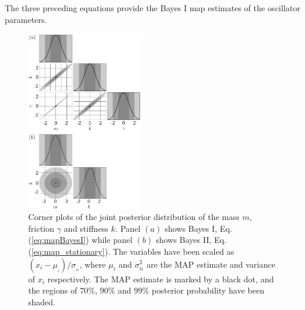 \documentclass[english,aps, twocolumn, pre,superscriptaddress, notitlepage]{revtex4-1}
\begin{document}
The three preceding equations provide the Bayes I map estimates of
the oscillator parameters. 
\begin{figure}
\includegraphics[width=0.45\textwidth]{Fig2}\caption{Corner plots of the joint posterior distribution of the mass $m$,
friction $\gamma$ and stiffness $k$. Panel $(a)$ shows Bayes I,
Eq.(\ref{eq:mapBayesI}) while panel $(b)$ shows Bayes II, Eq.(\ref{eq:map_stationary}).
The variables have been scaled as $\left(x_{i}-\mu_{_{i}}\right)/\sigma_{_{ii}}$,
where $\mu_{i}$ and $\sigma_{ii}^{2}$ are the MAP estimate and variance
of $x_{i}$ respectively. The MAP estimate is marked by a black dot,
and the regions of $70\%$, $90\%$ and $99\%$ posterior probability
have been shaded. \label{fig:inference}\label{fig:stationary}}
 
\end{figure}
\end{document}
